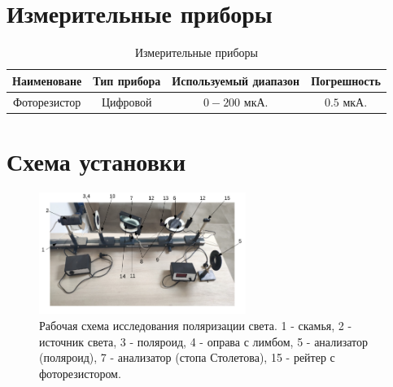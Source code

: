 \documentclass{article}
\begin{document}
\section{Измерительные приборы}
\begin{table}[h]
    \centering
    \bgroup
    \def\arraystretch{1.2}
    \begin{tabular}{|c|c|c|c|}
        \hline
        Наименоване & Тип прибора & Используемый диапазон & Погрешность \\
        \hline
        Фоторезистор & Цифровой & $0-200$ мкА. & $0.5$ мкА. \\
        \hline
    \end{tabular}
    \egroup
    \caption{Измерительные приборы} 
\end{table}
\section{Схема установки}
\begin{figure}[h!]
    \begin{center}
    \includegraphics[width=0.6\textwidth]{scheme.png}
    \caption{Рабочая схема исследования поляризации света. 1 - скамья, 2 - источник света, 3 - поляроид, 4 - оправа с лимбом, 5 - анализатор (поляроид), 7 - анализатор (стопа Столетова), 15 - рейтер с фоторезистором.}
    \label{fig:scheme}    
    \end{center}
\end{figure}
\end{document}
